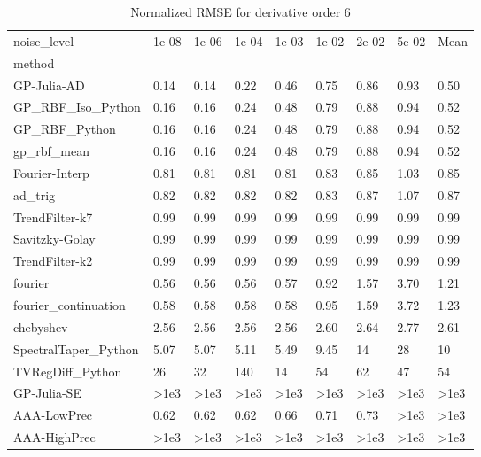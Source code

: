 \begin{table}
\caption{Normalized RMSE for derivative order 6}
\label{tab:nrmse_order_6}
\begin{tabular}{lllllllll}
\toprule
noise_level & 1e-08 & 1e-06 & 1e-04 & 1e-03 & 1e-02 & 2e-02 & 5e-02 & Mean \\
method &  &  &  &  &  &  &  &  \\
\midrule
GP-Julia-AD & 0.14 & 0.14 & 0.22 & 0.46 & 0.75 & 0.86 & 0.93 & 0.50 \\
GP_RBF_Iso_Python & 0.16 & 0.16 & 0.24 & 0.48 & 0.79 & 0.88 & 0.94 & 0.52 \\
GP_RBF_Python & 0.16 & 0.16 & 0.24 & 0.48 & 0.79 & 0.88 & 0.94 & 0.52 \\
gp_rbf_mean & 0.16 & 0.16 & 0.24 & 0.48 & 0.79 & 0.88 & 0.94 & 0.52 \\
Fourier-Interp & 0.81 & 0.81 & 0.81 & 0.81 & 0.83 & 0.85 & 1.03 & 0.85 \\
ad_trig & 0.82 & 0.82 & 0.82 & 0.82 & 0.83 & 0.87 & 1.07 & 0.87 \\
TrendFilter-k7 & 0.99 & 0.99 & 0.99 & 0.99 & 0.99 & 0.99 & 0.99 & 0.99 \\
Savitzky-Golay & 0.99 & 0.99 & 0.99 & 0.99 & 0.99 & 0.99 & 0.99 & 0.99 \\
TrendFilter-k2 & 0.99 & 0.99 & 0.99 & 0.99 & 0.99 & 0.99 & 0.99 & 0.99 \\
fourier & 0.56 & 0.56 & 0.56 & 0.57 & 0.92 & 1.57 & 3.70 & 1.21 \\
fourier_continuation & 0.58 & 0.58 & 0.58 & 0.58 & 0.95 & 1.59 & 3.72 & 1.23 \\
chebyshev & 2.56 & 2.56 & 2.56 & 2.56 & 2.60 & 2.64 & 2.77 & 2.61 \\
SpectralTaper_Python & 5.07 & 5.07 & 5.11 & 5.49 & 9.45 & 14 & 28 & 10 \\
TVRegDiff_Python & 26 & 32 & 140 & 14 & 54 & 62 & 47 & 54 \\
GP-Julia-SE & >1e3 & >1e3 & >1e3 & >1e3 & >1e3 & >1e3 & >1e3 & >1e3 \\
AAA-LowPrec & 0.62 & 0.62 & 0.62 & 0.66 & 0.71 & 0.73 & >1e3 & >1e3 \\
AAA-HighPrec & >1e3 & >1e3 & >1e3 & >1e3 & >1e3 & >1e3 & >1e3 & >1e3 \\
\bottomrule
\end{tabular}
\end{table}
